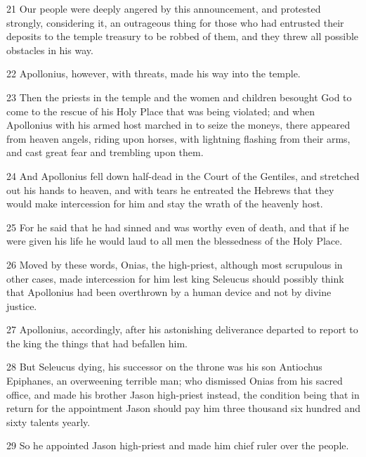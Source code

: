 \par 21 Our people were deeply angered by this announcement, and protested strongly, considering it, an outrageous thing for those who had entrusted their deposits to the temple treasury to be robbed of them, and they threw all possible obstacles in his way.

\par 22 Apollonius, however, with threats, made his way into the temple.

\par 23 Then the priests in the temple and the women and children besought God to come to the rescue of his Holy Place that was being violated; and when Apollonius with his armed host marched in to seize the moneys, there appeared from heaven angels, riding upon horses, with lightning flashing from their arms, and cast great fear and trembling upon them.

\par 24 And Apollonius fell down half-dead in the Court of the Gentiles, and stretched out his hands to heaven, and with tears he entreated the Hebrews that they would make intercession for him and stay the wrath of the heavenly host.

\par 25 For he said that he had sinned and was worthy even of death, and that if he were given his life he would laud to all men the blessedness of the Holy Place.

\par 26 Moved by these words, Onias, the high-priest, although most scrupulous in other cases, made intercession for him lest king Seleucus should possibly think that Apollonius had been overthrown by a human device and not by divine justice.

\par 27 Apollonius, accordingly, after his astonishing deliverance departed to report to the king the things that had befallen him.

\par 28 But Seleucus dying, his successor on the throne was his son Antiochus Epiphanes, an overweening terrible man; who dismissed Onias from his sacred office, and made his brother Jason high-priest instead, the condition being that in return for the appointment Jason should pay him three thousand six hundred and sixty talents yearly.

\par 29 So he appointed Jason high-priest and made him chief ruler over the people.

